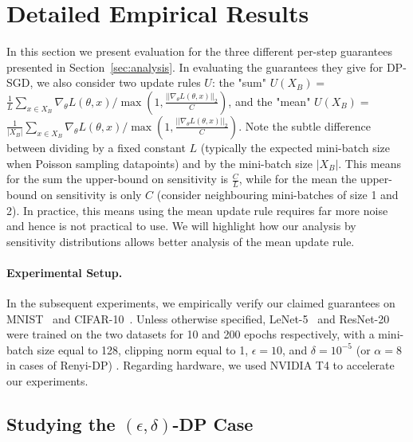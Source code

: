 \section{Detailed Empirical Results}
\label{sec:detailed_emp_res}





In this section we present evaluation for the three different per-step guarantees presented in Section~\ref{sec:analysis}. In evaluating the guarantees they give for DP-SGD, we also consider two update rules $U$: the "sum" $U(X_B) =$ \\ $ \frac{1}{L} \sum_{x \in X_B} \nabla_{\theta}L(\theta,x)/ \max(1,\frac{||\nabla_{\theta}L(\theta,x)||_2}{C})$, and the "mean" $U(X_B) =$ \\ $\frac{1}{|X_B|}\sum_{x \in X_B} \nabla_{\theta}L(\theta,x)/ \max(1,\frac{||\nabla_{\theta}L(\theta,x)||_2}{C})$. Note the subtle difference between dividing by a fixed constant $L$ (typically the expected mini-batch size when Poisson sampling datapoints) and by the mini-batch size $|X_B|$. This means for the sum the upper-bound on sensitivity is $\frac{C}{L}$, while for the mean the upper-bound on sensitivity is only $C$ (consider neighbouring mini-batches of size 1 and 2). In practice, this means using the mean update rule requires far more noise and hence is not practical to use. We will highlight how our analysis by sensitivity distributions allows better analysis of the mean update rule.


\paragraph{Experimental Setup.} In the subsequent experiments, we empirically verify our claimed guarantees on MNIST~\citep{lecun1998mnist} and CIFAR-10~\citep{krizhevsky2009learning}. Unless otherwise specified, LeNet-5~\citep{lecun1989backpropagation} and ResNet-20~\citep{he2016deep} were trained on the two datasets for 10 and 200 epochs respectively, with a mini-batch size equal to 128, clipping norm equal to 1, $\epsilon=10$, and $\delta = 10^{-5}$ (or $\alpha = 8$ in cases of Renyi-DP) 
. 
Regarding hardware, we used NVIDIA T4 to accelerate our experiments. 


\subsection{Studying the $(\epsilon,\delta)$-DP Case}
\label{ssec:eps_delta_experiments}

